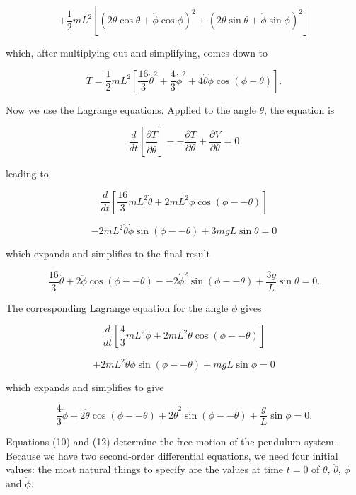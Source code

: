   $$+ \dfrac{1}{2}mL^2 \left[ \left(2 \dot{\theta}\cos \theta + \dot{\phi}\cos 
  \phi\right)^2 + \left(2 \dot{\theta}\sin \theta + \dot{\phi}\sin 
  \phi\right)^2 \right] \tag{6}$$ 

  which, after multiplying out and simplifying, comes down to 

  $$T=\dfrac{1}{2}mL^2 \left[ \dfrac{16}{3} \dot{\theta}^2 + \dfrac{4}{3} 
  \dot{\phi}^2 + 4 \dot{\theta} \dot{\phi} \cos (\phi-\theta) \right] . 
  \tag{7}$$ 

  Now we use the Lagrange equations. Applied to the angle $\theta$, the 
  equation is 

  $$\dfrac{d}{dt}\left[ \dfrac{\partial T}{\partial \dot{\theta}} \right] -- 
  \dfrac{\partial T}{\partial \theta} + \dfrac{\partial V}{\partial \theta} = 0 
  \tag{8}$$ 

  leading to 

  $$\dfrac{d}{dt}\left[\dfrac{16}{3}mL^2 \dot{\theta} + 2mL^2 \dot{\phi} \cos 
  (\phi -- \theta) \right] $$ 

  $$-2mL^2 \dot{\theta} \dot{\phi} \sin (\phi -- \theta) + 3mgL \sin \theta = 0 
  \tag{9}$$ 

  which expands and simplifies to the final result 

  $$\dfrac{16}{3}\ddot{\theta}+ 2\ddot{\phi}\cos (\phi -- \theta) -- 2 
  \dot{\phi}^2 \sin (\phi -- \theta) + \dfrac{3g}{L} \sin \theta = 0. 
  \tag{10}$$ 

  The corresponding Lagrange equation for the angle $\phi$ gives 

  $$\dfrac{d}{dt}\left[\dfrac{4}{3}mL^2 \dot{\phi} + 2mL^2 \dot{\theta} \cos 
  (\phi -- \theta) \right] $$ 

  $$+2mL^2 \dot{\theta} \dot{\phi} \sin (\phi -- \theta) + mgL \sin \phi = 0 
  \tag{11}$$ 

  which expands and simplifies to give 

  $$\dfrac{4}{3}\ddot{\phi}+ 2\ddot{\theta}\cos (\phi -- \theta) + 2 
  \dot{\theta}^2 \sin (\phi -- \theta) + \dfrac{g}{L} \sin \phi = 0. \tag{12}$$ 

  Equations (10) and (12) determine the free motion of the pendulum system. 
  Because we have two second-order differential equations, we need four initial 
  values: the most natural things to specify are the values at time $t=0$ of 
  $\theta$, $\dot{\theta}$, $\phi$ and $\dot{\phi}$. 